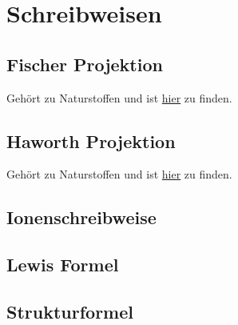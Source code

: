 \section{Schreibweisen}
\subsection{Fischer Projektion}
Gehört zu Naturstoffen und ist \hyperref[sec:fischer]{hier} zu finden.

\subsection{Haworth Projektion}
Gehört zu Naturstoffen und ist \hyperref[sec:haworth]{hier} zu finden.

\subsection{Ionenschreibweise}

\subsection{Lewis Formel}

\subsection{Strukturformel}
